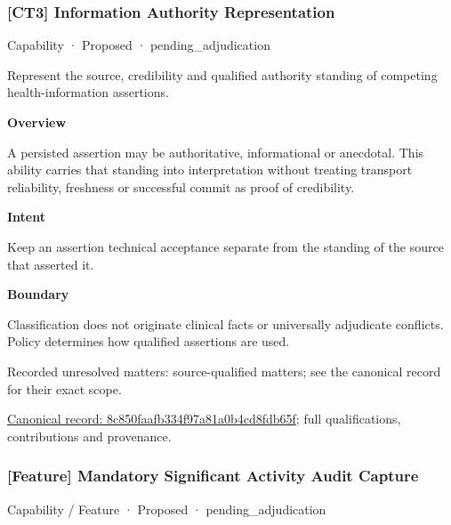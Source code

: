 \subsubsection{[CT3] Information Authority Representation}

\label{element:8c850faafb334f97a81a0b4cd8fdb65f}
{\small Capability · Proposed · pending\_adjudication}\par

Represent the source, credibility and qualified authority standing of competing health-information assertions.



\textbf{Overview}



A persisted assertion may be authoritative, informational or anecdotal. This ability carries that standing into interpretation without treating transport reliability, freshness or successful commit as proof of credibility.



\textbf{Intent}



Keep an assertion technical acceptance separate from the standing of the source that asserted it.



\textbf{Boundary}



Classification does not originate clinical facts or universally adjudicate conflicts. Policy determines how qualified assertions are used.


{\small Recorded unresolved matters: source-qualified matters; see the canonical record for their exact scope.}\par
{\footnotesize \href{../../../../continuum/strategy/capability/8c850faafb334f97a81a0b4cd8fdb65f.md}{Canonical record: 8c850faafb334f97a81a0b4cd8fdb65f}; full qualifications, contributions and provenance.}\par
\subsubsection{[Feature] Mandatory Significant Activity Audit Capture}

\label{element:b69936757c4446a7a1b57a455aae7a5f}
{\small Capability / Feature · Proposed · pending\_adjudication}\par

